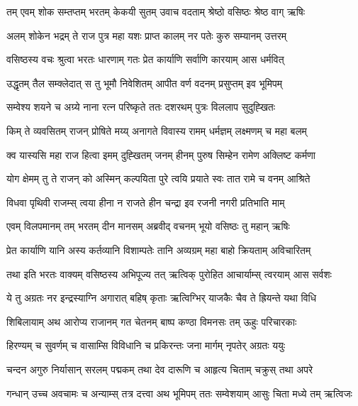 
\twolineshloka
{तम् एवम् शोक सम्तप्तम् भरतम् केकयी सुतम्}
{उवाच वदताम् श्रेष्ठो वसिष्ठः श्रेष्ठ वाग् ऋषिः} %

\twolineshloka
{अलम् शोकेन भद्रम् ते राज पुत्र महा यशः}
{प्राप्त कालम् नर पतेः कुरु सम्यानम् उत्तरम्} %

\twolineshloka
{वसिष्ठस्य वचः श्रुत्वा भरतः धारणाम् गतः}
{प्रेत कार्याणि सर्वाणि कारयाम् आस धर्मवित्} %

\twolineshloka
{उद्धृतम् तैल सम्क्लेदात् स तु भूमौ निवेशितम्}
{आपीत वर्ण वदनम् प्रसुप्तम् इव भूमिपम्} %

\twolineshloka
{सम्वेश्य शयने च अग्र्ये नाना रत्न परिष्कृते}
{ततः दशरथम् पुत्रः विललाप सुदुह्खितः} %

\twolineshloka
{किम् ते व्यवसितम् राजन् प्रोषिते मय्य् अनागते}
{विवास्य रामम् धर्मज्ञम् लक्ष्मणम् च महा बलम्} %

\twolineshloka
{क्व यास्यसि महा राज हित्वा इमम् दुह्खितम् जनम्}
{हीनम् पुरुष सिम्हेन रामेण अक्लिष्ट कर्मणा} %

\twolineshloka
{योग क्षेमम् तु ते राजन् को अस्मिन् कल्पयिता पुरे}
{त्वयि प्रयाते स्वः तात रामे च वनम् आश्रिते} %

\twolineshloka
{विधवा पृथिवी राजम्स् त्वया हीना न राजते}
{हीन चन्द्रा इव रजनी नगरी प्रतिभाति माम्} %

\twolineshloka
{एवम् विलपमानम् तम् भरतम् दीन मानसम्}
{अब्रवीद् वचनम् भूयो वसिष्ठः तु महान् ऋषिः} %

\twolineshloka
{प्रेत कार्याणि यानि अस्य कर्तव्यानि विशाम्पतेः}
{तानि अव्यग्रम् महा बाहो क्रियताम् अविचारितम्} %

\twolineshloka
{तथा इति भरतः वाक्यम् वसिष्ठस्य अभिपूज्य तत्}
{ऋत्विक् पुरोहित आचार्याम्स् त्वरयाम् आस सर्वशः} %

\twolineshloka
{ये तु अग्रतः नर इन्द्रस्याग्नि अगारात् बहिष् कृताः}
{ऋत्विग्भिर् याजकैः चैव ते ह्रियन्ते यथा विधि} %

\twolineshloka
{शिबिलायाम् अथ आरोप्य राजानम् गत चेतनम्}
{बाष्प कण्ठा विमनसः तम् ऊहुः परिचारकाः} %

\twolineshloka
{हिरण्यम् च सुवर्णम् च वासाम्सि विविधानि च}
{प्रकिरन्तः जना मार्गम् नृपतेर् अग्रतः ययुः} %

\twolineshloka
{चन्दन अगुरु निर्यासान् सरलम् पद्मकम् तथा}
{देव दारूणि च आहृत्य चिताम् चक्रुस् तथा अपरे} %

\twolineshloka
{गन्धान् उच्च अवचामः च अन्याम्स् तत्र दत्त्वा अथ भूमिपम्}
{ततः सम्वेशयाम् आसुः चिता मध्ये तम् ऋत्विजः} %

